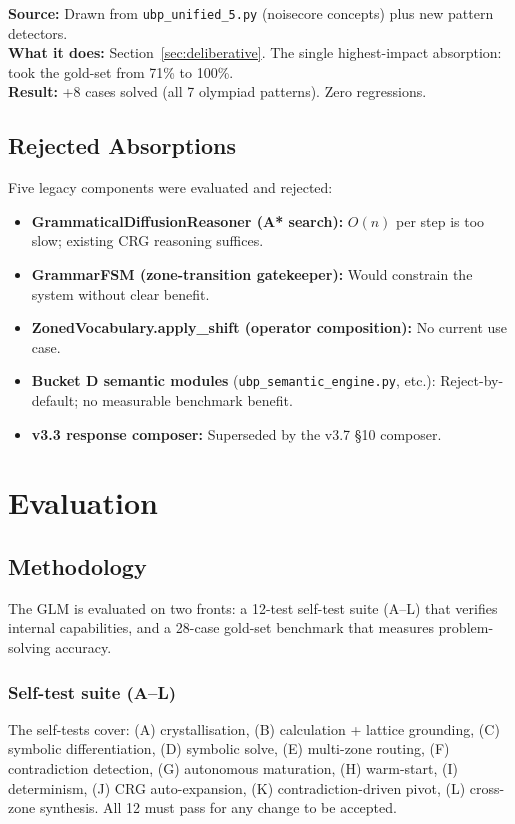 \documentclass[11pt,a4paper]{article}
\begin{document}
\textbf{Source:} Drawn from \texttt{ubp\_unified\_5.py} (noisecore concepts) plus new pattern detectors. \\
\textbf{What it does:} Section~\ref{sec:deliberative}. The single highest-impact absorption: took the gold-set from 71\% to 100\%. \\
\textbf{Result:} +8 cases solved (all 7 olympiad patterns). Zero regressions.

\subsection{Rejected Absorptions}

Five legacy components were evaluated and rejected:

\begin{itemize}
    \item \textbf{GrammaticalDiffusionReasoner (A* search):} $O(n)$ per step is too slow; existing CRG reasoning suffices.
    \item \textbf{GrammarFSM (zone-transition gatekeeper):} Would constrain the system without clear benefit.
    \item \textbf{ZonedVocabulary.apply\_shift (operator composition):} No current use case.
    \item \textbf{Bucket D semantic modules} (\texttt{ubp\_semantic\_engine.py}, etc.): Reject-by-default; no measurable benchmark benefit.
    \item \textbf{v3.3 response composer:} Superseded by the v3.7 \S10 composer.
\end{itemize}

\section{Evaluation}
\label{sec:evaluation}

\subsection{Methodology}

The GLM is evaluated on two fronts: a 12-test self-test suite (A--L) that verifies internal capabilities, and a 28-case gold-set benchmark that measures problem-solving accuracy.

\subsubsection{Self-test suite (A--L)}
The self-tests cover: (A) crystallisation, (B) calculation + lattice grounding, (C) symbolic differentiation, (D) symbolic solve, (E) multi-zone routing, (F) contradiction detection, (G) autonomous maturation, (H) warm-start, (I) determinism, (J) CRG auto-expansion, (K) contradiction-driven pivot, (L) cross-zone synthesis. All 12 must pass for any change to be accepted.
\end{document}

